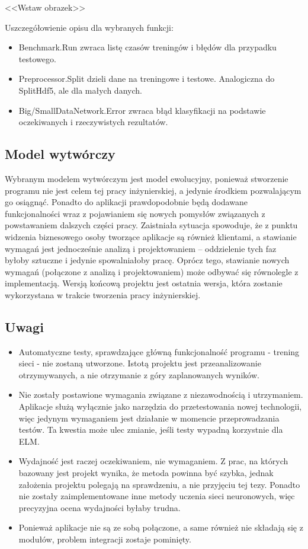 \documentclass{article}
\begin{document}
<<Wstaw obrazek>>

Uszczegółowienie opisu dla wybranych funkcji:
\begin{itemize}
\item Benchmark.Run zwraca listę czasów treningów i błędów dla przypadku testowego.
\item Preprocessor.Split dzieli dane na treningowe i testowe. Analogiczna do SplitHdf5, ale dla małych danych.
\item Big/SmallDataNetwork.Error zwraca błąd klasyfikacji na podstawie oczekiwanych i rzeczywistych rezultatów.
\end{itemize}

\subsection{Model wytwórczy}
Wybranym modelem wytwórczym jest model ewolucyjny, ponieważ stworzenie programu nie jest celem tej pracy inżynierskiej, a jedynie środkiem pozwalającym go osiągnąć. Ponadto do aplikacji prawdopodobnie będą dodawane funkcjonalności wraz z pojawianiem się nowych pomysłów związanych z powstawaniem dalszych części pracy. Zaistniała sytuacja spowoduje, że z punktu widzenia biznesowego osoby tworzące aplikacje są również klientami, a stawianie wymagań jest jednocześnie analizą i projektowaniem -- oddzielenie tych faz byłoby sztuczne i jedynie spowalniałoby pracę. Oprócz tego, stawianie nowych wymagań (połączone z analizą i projektowaniem) może odbywać się równolegle z implementacją. Wersją końcową projektu jest ostatnia wersja, która zostanie wykorzystana w trakcie tworzenia pracy inżynierskiej.

\subsection{Uwagi}
\begin{itemize}
\item Automatyczne testy, sprawdzające główną funkcjonalność programu - trening sieci - nie zostaną utworzone. Istotą projektu jest przeanalizowanie otrzymywanych, a nie otrzymanie z góry zaplanowanych wyników.
\item Nie zostały postawione wymagania związane z niezawodnością i utrzymaniem. Aplikacje służą wyłącznie jako narzędzia do przetestowania nowej technologii, więc jedynym wymaganiem jest działanie w momencie przeprowadzania testów. Ta kwestia może ulec zmianie, jeśli testy wypadną korzystnie dla ELM.
\item Wydajność jest raczej oczekiwaniem, nie wymaganiem. Z prac, na których bazowany jest projekt wynika, że metoda powinna być szybka, jednak założenia projektu polegają na sprawdzeniu, a nie przyjęciu tej tezy. Ponadto nie zostały zaimplementowane inne metody uczenia sieci neuronowych, więc precyzyjna ocena wydajności byłaby trudna.
\item Ponieważ aplikacje nie są ze sobą połączone, a same również nie składają się z modułów, problem integracji zostaje pominięty.
\end{itemize}
\clearpage
\end{document}
